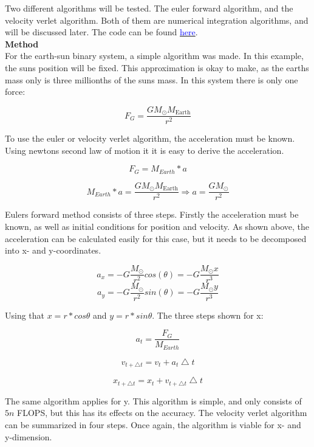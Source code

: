 \documentclass[10pt,a4paper]{article}
\begin{document}
\noindent Two different algorithms will be tested. The euler forward algorithm, and the velocity verlet algorithm. Both of them are numerical integration algorithms, and will be discussed later. The code can be found \href{https://github.com/VemundStenbekkThorkildsen/Assigment3}{\textcolor{blue}{here}}. \\   





{\LARGE\bf
Method
}\\

\noindent For the earth-sun binary system, a simple algorithm was made. In this example, the suns position will be fixed. This approximation is okay to make, as the earths mass only is three millionths of the suns mass. In this system there is only one force:


$$
F_G=\frac{GM_{\odot}M_{\mathrm{Earth}}}{r^2}
$$

\noindent To use the euler or velocity verlet algorithm, the acceleration must be known. Using newtons second law of motion it it is easy to derive the acceleration. 


$$F_G=M_{Earth}*a $$

$$M_{Earth}*a=\frac{GM_{\odot}M_{\mathrm{Earth}}}{r^2} \Rightarrow a=\frac{GM_{\odot}}{r^2}$$

\noindent Eulers forward method consists of three steps. Firstly the acceleration must be known, as well as initial conditions for position and velocity. As shown above, the acceleration can be calculated easily for this case, but it needs to be decomposed into x- and y-coordinates. 

$$a_x=-G\frac{M_{\odot}}{r^2}cos(\theta)=-G\frac{M_{\odot}x}{r^3}$$
$$a_y=-G\frac{M_{\odot}}{r^2}sin(\theta)=-G\frac{M_{\odot}y}{r^3}$$

\noindent Using that $x=r*cos\theta$ and $y=r*sin\theta$.  The three steps shown for x:

$$a_t=\frac{F_G}{M_{Earth}}$$

$$v_{t+\bigtriangleup t}=v_t + a_t\bigtriangleup t $$

$$x_{t+\bigtriangleup t}=x_t + v_{t+\bigtriangleup t}\bigtriangleup t$$

\noindent The same algorithm applies for y. This algorithm is simple, and only consists of $5n$ FLOPS, but this has its effects on the accuracy. The velocity verlet algorithm can be summarized in four steps. Once again, the algorithm is viable for x- and y-dimension.  
\end{document}
